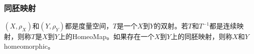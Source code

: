 \subsubsection{同胚映射}
\begin{definition}
	$(X,\rho_X)$和$(Y,\rho_Y)$都是度量空间，$T$是一个$X$到$Y$的双射。若$T$和$T^{-1}$都是连续映射，则称$T$是$X$到$Y$上的\gls{HomeoMap}。如果存在一个$X$到$Y$上的同胚映射，则称$X$和$Y$\gls{homeomorphic}。
\end{definition}